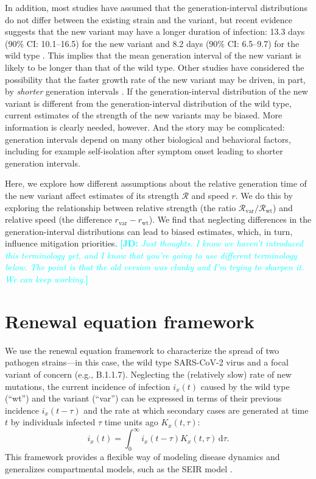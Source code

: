 \documentclass[12pt]{article}
\newcommand{\comment}{\showcomment}
\newcommand{\showcomment}[3]{\textcolor{#1}{\textbf{[#2: }\textsl{#3}\textbf{]}}}
\newcommand{\jd}[1]{\comment{cyan}{JD}{#1}}
\newcommand{\vvvar}{\mathrm{var}}
\newcommand{\wwwt}{\mathrm{wt}}
\newcommand{\rx}[1]{\ensuremath{{r}_{#1}}\xspace}
\newcommand{\rw}{\rx{\wwwt}}
\newcommand{\rv}{\rx{\vvvar}}
\newcommand{\Rx}[1]{\ensuremath{{\mathcal R}_{#1}}\xspace}
\newcommand{\RR}{\ensuremath{{\mathcal R}}\xspace}
\newcommand{\Rw}{\Rx{\wwwt}}
\newcommand{\Rv}{\Rx{\vvvar}}
\newcommand{\dd}[1]{\ensuremath{\, \mathrm{d}#1}}
\newcommand{\dtau}{\dd{\tau}}
\begin{document}
In addition, most studies have assumed that the generation-interval distributions do not differ between the existing strain and the variant, but recent evidence suggests that the new variant may have a longer duration of infection: 13.3 days (90\% CI: 10.1--16.5) for the new variant and 8.2 days (90\% CI: 6.5--9.7) for the wild type \citep{kissler2021densely}.
This implies that the mean generation interval of the new variant is likely to be longer than that of the wild type.
Other studies have considered the possibility that the faster growth rate of the new variant may be driven, in part, by \emph{shorter} generation intervals \citep{davies2021estimated,volz2021transmission}.
If the generation-interval distribution of the new variant is different from the generation-interval distribution of the wild type, current estimates of the strength of the new variants may be biased.
More information is clearly needed, however. 
And the story may be complicated: generation intervals depend on many other biological and behavioral factors, including for example self-isolation after symptom onset leading to shorter generation intervals.

Here, we explore how different assumptions about the relative generation time of the new variant affect estimates of its strength $\RR$ and speed $r$.
We do this by exploring the relationship between relative strength (the ratio $\Rv/\Rw$) and relative speed (the difference $\rv-\rw$).
We find that neglecting differences in the generation-interval distributions can lead to biased estimates, which, in turn, influence mitigation priorities.
\jd{Just thoughts. I know we haven't introduced this terminology yet, and I know that you're going to use different terminology below. The point is that the old version was clunky and I'm trying to sharpen it. We can keep working.}

\section{Renewal equation framework}

We use the renewal equation framework to characterize the spread of two pathogen strains---in this case, the wild type SARS-CoV-2 virus and a focal variant of concern (e.g., B.1.1.7).
Neglecting the (relatively slow) rate of new mutations, the current incidence of infection $i_x(t)$ caused by the wild type (``wt'') and the variant (``var'') can be expressed in terms of their previous incidence $i_x(t-\tau)$ and the rate at which secondary cases are generated at time $t$ by individuals infected $\tau$ time units ago $K_x(t, \tau)$:
\begin{equation}
i_x(t) = \int_0^\infty i_x(t-\tau) K_x(t, \tau) \dtau.
\end{equation}
This framework provides a flexible way of modeling disease dynamics and generalizes compartmental models, such as the SEIR model \citep{heesterbeek1996concept, diekmann2000mathematical, roberts2004modelling, aldis2005integral, roberts2007model, champredon2018equivalence}.
\end{document}
